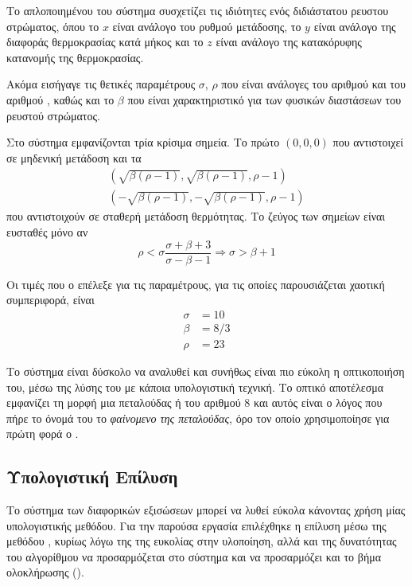 Το απλοποιημένου του σύστημα συσχετίζει τις ιδιότητες ενός διδιάστατου ρευστου στρώματος, όπου το $x$ είναι ανάλογο του ρυθμού μετάδοσης, το $y$ είναι ανάλογο της διαφοράς θερμοκρασίας κατά μήκος και το $z$ είναι ανάλογο της κατακόρυφης κατανομής της θερμοκρασίας.

Ακόμα εισήγαγε τις θετικές παραμέτρους $σ$, $ρ$ που είναι ανάλογες του αριθμού  και του αριθμού , καθώς και το $β$ που είναι χαρακτηριστικό για των φυσικών διαστάσεων του ρευστού στρώματος.

Στο σύστημα εμφανίζονται τρία κρίσιμα σημεία. Το πρώτο $\left(0, 0, 0\right)$ που αντιστοιχεί σε μηδενική μετάδοση και τα 
\begin{align}
    \left( \sqrt{β\left(ρ-1\right)} , \sqrt{β\left(ρ-1\right)} , ρ-1\right) \\
    \left( -\sqrt{β\left(ρ-1\right)} , -\sqrt{β\left(ρ-1\right)} , ρ-1\right)
\end{align}
που αντιστοιχούν σε σταθερή μετάδοση θερμότητας. Το ζεύγος των σημείων είναι ευσταθές μόνο αν 
\begin{equation}
    ρ < σ\dfrac{σ+β+3}{σ-β-1} \Rightarrow σ>β+1
\end{equation}

Οι τιμές που ο  επέλεξε για τις παραμέτρους, για τις οποίες παρουσιάζεται χαοτική συμπεριφορά, είναι
\begin{align}
    σ &= 10 \\
    β &= 8/3 \\
    ρ &= 23
\end{align}

Το σύστημα είναι δύσκολο να αναλυθεί και συνήθως είναι πιο εύκολη η οπτικοποιήση του, μέσω της λύσης του με κάποια υπολογιστική τεχνική. Το οπτικό αποτέλεσμα εμφανίζει τη μορφή μια πεταλούδας ή του αριθμού 8 και αυτός είναι ο λόγος που πήρε το όνομά του το \textit{φαίνομενο της πεταλούδας}, όρο τον οποίο χρησιμοποίησε για πρώτη φορά ο .

\subsection{Υπολογιστική Επίλυση}

Το σύστημα των διαφορικών εξισώσεων μπορεί να λυθεί εύκολα κάνοντας χρήση μίας υπολογιστικής μεθόδου. Για την παρούσα εργασία επιλέχθηκε η επίλυση μέσω της μεθόδου \textit{}, κυρίως λόγω της της ευκολίας στην υλοποίηση, αλλά και της δυνατότητας του αλγορίθμου να προσαρμόζεται στο σύστημα και να προσαρμόζει και το βήμα ολοκλήρωσης ().

